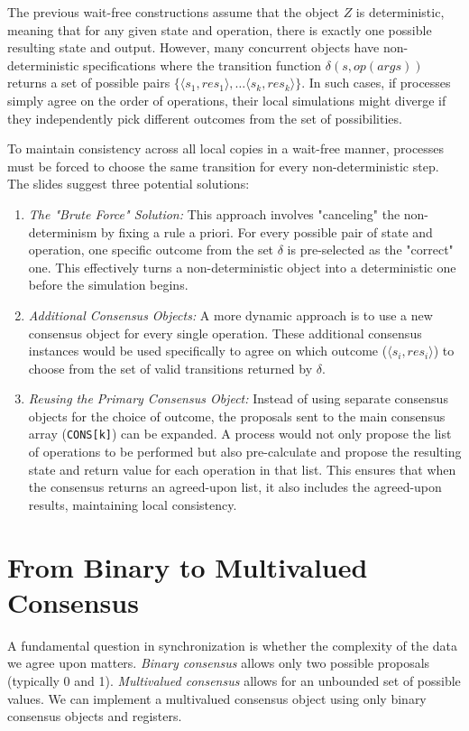 The previous wait-free constructions assume that the object $Z$ is deterministic, meaning that for any given state and operation, there is exactly one possible resulting state and output. However, many concurrent objects have non-deterministic specifications where the transition function $\delta(s,op(args))$ returns a set of possible pairs $\{\langle s_1,res_1\rangle,\ldots\langle s_k,res_k\rangle\}$. In such cases, if processes simply agree on the order of operations, their local simulations might diverge if they independently pick different outcomes from the set of possibilities.

To maintain consistency across all local copies in a wait-free manner, processes must be forced to choose the same transition for every non-deterministic step. The slides suggest three potential solutions:
\begin{enumerate}
    \item \textit{The "Brute Force" Solution:} This approach involves "canceling" the non-determinism by fixing a rule a priori. For every possible pair of state and operation, one specific outcome from the set $\delta$ is pre-selected as the "correct" one. This effectively turns a non-deterministic object into a deterministic one before the simulation begins.
    \item \textit{Additional Consensus Objects:} A more dynamic approach is to use a new consensus object for every single operation. These additional consensus instances would be used specifically to agree on which outcome ($\langle s_i,res_i\rangle$) to choose from the set of valid transitions returned by $\delta$.
    \item \textit{Reusing the Primary Consensus Object:} Instead of using separate consensus objects for the choice of outcome, the proposals sent to the main consensus array (\texttt{CONS[k]}) can be expanded. A process would not only propose the list of operations to be performed but also pre-calculate and propose the resulting state and return value for each operation in that list. This ensures that when the consensus returns an agreed-upon list, it also includes the agreed-upon results, maintaining local consistency.
\end{enumerate}

\section{From Binary to Multivalued Consensus}
A fundamental question in synchronization is whether the complexity of the data we agree upon matters. \textit{Binary consensus} allows only two possible proposals (typically 0 and 1). \textit{Multivalued consensus} allows for an unbounded set of possible values. We can implement a multivalued consensus object using only binary consensus objects and registers.

